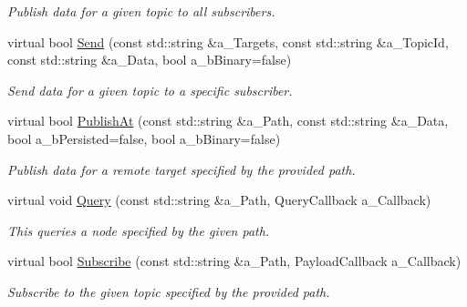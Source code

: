 \begin{DoxyCompactItemize}
\begin{DoxyCompactList}\small\item\em Publish data for a given topic to all subscribers. \end{DoxyCompactList}\item 
\mbox{\label{class_topic_manager_ae24c44e8c13b33798300da4001e9c0a8}} 
virtual bool \hyperlink{class_topic_manager_ae24c44e8c13b33798300da4001e9c0a8}{Send} (const std\+::string \&a\+\_\+\+Targets, const std\+::string \&a\+\_\+\+Topic\+Id, const std\+::string \&a\+\_\+\+Data, bool a\+\_\+b\+Binary=false)
\begin{DoxyCompactList}\small\item\em Send data for a given topic to a specific subscriber. \end{DoxyCompactList}\item 
\mbox{\label{class_topic_manager_ac1cef454d6fb66b9fd70596b9dbc2b72}} 
virtual bool \hyperlink{class_topic_manager_ac1cef454d6fb66b9fd70596b9dbc2b72}{Publish\+At} (const std\+::string \&a\+\_\+\+Path, const std\+::string \&a\+\_\+\+Data, bool a\+\_\+b\+Persisted=false, bool a\+\_\+b\+Binary=false)
\begin{DoxyCompactList}\small\item\em Publish data for a remote target specified by the provided path. \end{DoxyCompactList}\item 
virtual void \hyperlink{class_topic_manager_a7b1d312d794d8876c0ea8592eb41a82b}{Query} (const std\+::string \&a\+\_\+\+Path, Query\+Callback a\+\_\+\+Callback)
\begin{DoxyCompactList}\small\item\em This queries a node specified by the given path. \end{DoxyCompactList}\item 
virtual bool \hyperlink{class_topic_manager_a45df0bdd5a5d9ba4dfbb471726cf04c5}{Subscribe} (const std\+::string \&a\+\_\+\+Path, Payload\+Callback a\+\_\+\+Callback)
\begin{DoxyCompactList}\small\item\em Subscribe to the given topic specified by the provided path. \end{DoxyCompactList}\item 
\mbox{\label{class_topic_manager_a5d1380adbc66f961a43179cb079d28d8}} 

\end{DoxyCompactItemize}
